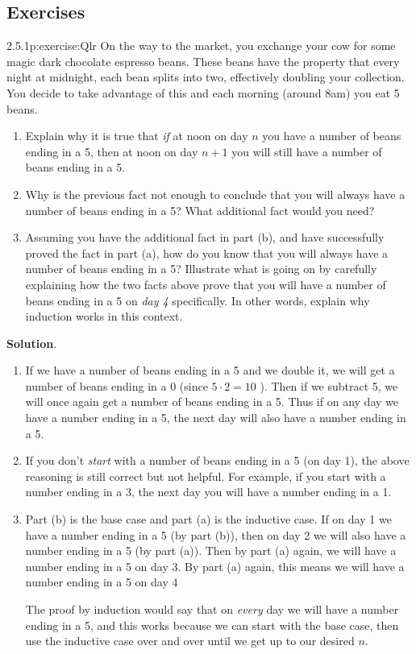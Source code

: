 \documentclass[twoside,11pt,]{book}
\newcommand{\blocktitlefont}{\relax}
\numberwithin{equation}{chapter}
\begin{document}
\subsection*{Exercises}
\begin{divisionsolution}{2.5.1}{}{p:exercise:Qlr}%
On the way to the market, you exchange your cow for some magic dark chocolate espresso beans. These beans have the property that every night at midnight, each bean splits into two, effectively doubling your collection. You decide to take advantage of this and each morning (around 8am) you eat 5 beans.%
\begin{enumerate}[label=(\alph*)]
\item{}Explain why it is true that \emph{if} at noon on day \(n\) you have a number of beans ending in a 5, then at noon on day \(n+1\) you will still have a number of beans ending in a 5.%
\item{}Why is the previous fact not enough to conclude that you will always have a number of beans ending in a 5? What additional fact would you need?%
\item{}Assuming you have the additional fact in part (b), and have successfully proved the fact in part (a), how do you know that you will always have a number of beans ending in a 5? Illustrate what is going on by carefully explaining how the two facts above prove that you will have a number of beans ending in a 5 on \emph{day 4} specifically. In other words, explain why induction works in this context.%
\end{enumerate}
%
\par\smallskip%
\noindent\textbf{\blocktitlefont Solution}.\quad{}%
\begin{enumerate}[label=(\alph*)]
\item{}If we have a number of beans ending in a 5 and we double it, we will get a number of beans ending in a 0 (since \(5\cdot 2 = 10\) ). Then if we subtract 5, we will once again get a number of beans ending in a 5. Thus if on any day we have a number ending in a 5, the next day will also have a number ending in a 5.%
\item{}If you don't \emph{start} with a number of beans ending in a 5 (on day 1), the above reasoning is still correct but not helpful. For example, if you start with a number ending in a 3, the next day you will have a number ending in a 1.%
\item{}Part (b) is the base case and part (a) is the inductive case. If on day 1 we have a number ending in a 5 (by part (b)), then on day 2 we will also have a number ending in a 5 (by part (a)). Then by part (a) again, we will have a number ending in a 5 on day 3. By part (a) again, this means we will have a number ending in a 5 on day 4%
\par
The proof by induction would say that on \emph{every} day we will have a number ending in a 5, and this works because we can start with the base case, then use the inductive case over and over until we get up to our desired \(n\).%
\end{enumerate}
%
\end{divisionsolution}%
\end{document}
